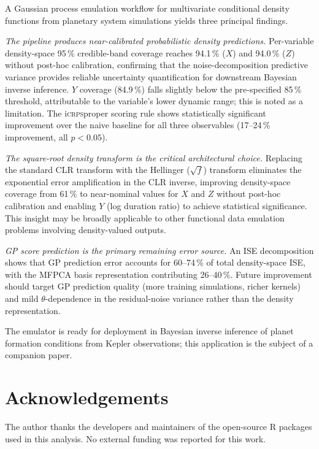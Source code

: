 \documentclass[12pt,a4paper]{article}
\newcommand{\iCRPS}{i\textsc{crps}}
\newcommand{\spar}{\theta}
\begin{document}
A Gaussian process emulation workflow for multivariate conditional
density functions from planetary system simulations yields three
principal findings.

\emph{The pipeline produces near-calibrated probabilistic density
predictions.}  Per-variable density-space 95\,\% credible-band
coverage reaches 94.1\,\% ($X$) and 94.0\,\% ($Z$) without post-hoc
calibration, confirming that the noise-decomposition predictive
variance provides reliable uncertainty quantification for downstream
Bayesian inverse inference.  $Y$ coverage (84.9\,\%) falls slightly
below the pre-specified 85\,\% threshold, attributable to the variable's
lower dynamic range; this is noted as a limitation.  The \iCRPS proper
scoring rule shows statistically significant improvement over the naive
baseline for all three observables (17--24\,\% improvement, all
$p<0.05$).

\emph{The square-root density transform is the critical architectural
choice.}  Replacing the standard CLR transform with the Hellinger
($\sqrt{f}$) transform eliminates the exponential error amplification
in the CLR inverse, improving density-space coverage from 61\,\% to
near-nominal values for $X$ and $Z$ without post-hoc calibration and
enabling $Y$ (log duration ratio) to achieve statistical significance.
This insight may be broadly applicable to other
functional data emulation problems involving density-valued outputs.

\emph{GP score prediction is the primary remaining error source.}
An ISE decomposition shows that GP prediction error accounts for
60--74\,\% of total density-space ISE, with the MFPCA basis
representation contributing 26--40\,\%.  Future improvement should
target GP prediction quality (more training simulations, richer
kernels) and mild $\spar$-dependence in the residual-noise variance
rather than the density representation.

The emulator is ready for deployment in Bayesian inverse inference of
planet formation conditions from Kepler observations; this application
is the subject of a companion paper.

\section*{Acknowledgements}
The author thanks the developers and maintainers of the open-source
\textsf{R} packages used in this analysis.  No external funding was
reported for this work.
\end{document}
